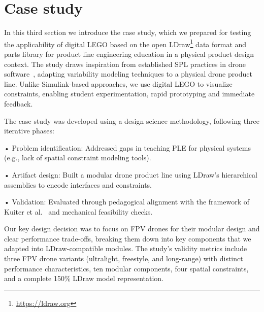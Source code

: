 \documentclass[sigconf,review]{acmart}
\begin{document}
\section{Case study}
\label{sec:case-study}

In this third section we introduce the case study, which we prepared for testing the applicability of digital LEGO based on the open LDraw\footnote{\url{https://ldraw.org}} data format and parts library for product line engineering education in a physical product design context.
The study draws inspiration from established SPL practices in drone software~\cite{Steiner_2014}, adapting variability modeling techniques to a physical drone product line. 
Unlike Simulink-based approaches, we use digital LEGO to visualize constraints, enabling student experimentation, rapid prototyping and immediate feedback.

The case study was developed using a design science methodology, following three iterative phases:

•	Problem identification: Addressed gaps in teaching PLE for physical systems (e.g., lack of spatial constraint modeling tools).

•	Artifact design: Built a modular drone product line using LDraw’s hierarchical assemblies to encode interfaces and constraints.

•	Validation: Evaluated through pedagogical alignment with the framework of Kuiter et al.~\cite{Kuiter_2025} and mechanical feasibility checks.

Our key design decision was to focus on FPV drones for their modular design and clear performance trade-offs, breaking them down into key components that we adapted into LDraw-compatible modules. 
The study's validity metrics include three FPV drone variants (ultralight, freestyle, and long-range) with distinct performance characteristics, ten modular components, four spatial constraints, and a complete 150\% LDraw model representation.
\end{document}
